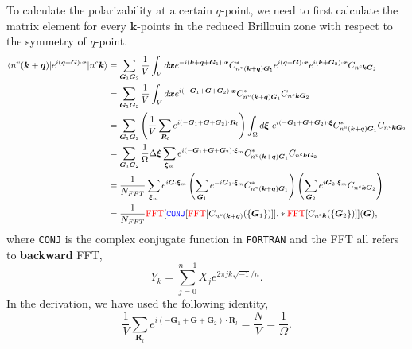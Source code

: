 \documentclass[11pt, oneside]{article}          %
\begin{document}
To calculate the polarizability at a certain $q$-point, we need to first calculate the matrix element for every ${\bm k}$-points in the reduced Brillouin zone with respect to the symmetry of $q$-point.
\begin{equation}
  \label{eq:scalar_EpsilonMatrixElement}
  \begin{aligned}
    \langle n^{v}({\bm k}+{\bm q}) | e^{i({\bm q}+{\bm G})\cdot {\bm x}} | n^{c}{\bm k} \rangle & = \sum_{{\bm G}_1 {\bm G}_2} \frac{1}{V} \int_V d{\bm x} e^{-i({\bm k}+{\bm q}+{\bm G}_1)\cdot {\bm x}} C^{*}_{n^{v}({\bm k}+{\bm q}){\bm G}_1} e^{i({\bm q}+{\bm G})\cdot {\bm x}} e^{i({\bm k}+{\bm
        G}_2)\cdot {\bm x}} C_{n^{c}{\bm k} {\bm G}_2} \\
    & = \sum_{{\bm G}_1 {\bm G}_2} \frac{1}{V} \int_{V} d{\bm x} e^{i(-{\bm G}_1+{\bm G}+{\bm G}_2)\cdot {\bm x}} C^{*}_{n^{v}({\bm k}+{\bm q}){\bm G}_1} C_{n^{c}{\bm k}{\bm G}_2} \\
    & = \sum_{{\bm G}_1{\bm G}_2} \left ( \frac{1}{V} \sum_{{\bm R}_l} e^{i(-{\bm G}_1+{\bm G}+{\bm G}_2)\cdot {\bm R}_l} \right ) \int_{\Omega} d {\bm \xi}~e^{i(-{\bm G}_1 + {\bm G} + {\bm G}_2)\cdot {\bm \xi}} C^{*}_{n^{v}({\bm k}+{\bm q}){\bm G}_1} C_{n^{c}{\bm k}{\bm G}_2} \\
    & = \sum_{{\bm G}_1 {\bm G}_2} \frac{1}{\Omega} \Delta {\bm \xi} \sum_{{\bm \xi}_m} e^{i(-{\bm G}_1 + {\bm G}+{\bm G}_2)\cdot {\bm \xi}_m} C^{*}_{n^{v}({\bm k}+{\bm q}){\bm G}_1} C_{n^{c}{\bm k}{\bm G}_2} \\
    & = \frac{1}{N_{FFT}} \sum_{{\bm \xi}_m} e^{i{\bm G}\cdot {\bm \xi}_m} \left ( \sum_{{\bm G}_1} e^{-i{\bm G}_1 \cdot {\bm \xi}_m} C^{*}_{n^{v} ({\bm k}+{\bm q}){\bm G}_1} \right ) \left ( \sum_{{\bm G}_2} e^{i{\bm G}_2 \cdot {\bm \xi}_m} C_{n^{c} {\bm k}{\bm G}_2} \right ) \\
    & = \frac{1}{N_{FFT}} {\color{red} \text{FFT}}[{\color{blue} \text{{\tt CONJ}}}[{\color{red} \text{FFT}}[C_{n^{v}({\bm k}+{\bm q})}(\{ {\bm G}_1 \})]].* {\color{red} \text{FFT}}[C_{n^{c}{\bm k}}(\{ {\bm G}_2 \})]]({\bm G}),
  \end{aligned}
\end{equation}
where {\color{blue} {\tt CONJ}} is the complex conjugate function in {\tt FORTRAN} and the {\color{red} FFT} all refers to {\bf backward} FFT,
\begin{equation}
  \label{eq:1DBackwardFFT_0}
  Y_k = \sum^{n-1}_{j=0} X_j e^{2\pi j k \sqrt{-1}/n}.
\end{equation}
In the derivation, we have used the following identity,
\begin{equation}
  \label{eq:1/N}
  \frac{1}{V} \sum_{{\bm R}_l} e^{i(-{\bm G}_1 + {\bm G}+{\bm G}_2)\cdot {\bm R}_l} = \frac{N}{V} = \frac{1}{\Omega}.
\end{equation}
\end{document}
